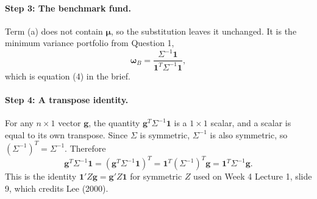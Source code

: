 \documentclass[11pt]{article}
\numberwithin{equation}{section}
\begin{document}
\paragraph{Step 3: The benchmark fund.}
Term (a) does not contain $\bm{\mu}$, so the substitution leaves it unchanged. It is the minimum variance portfolio from Question 1,
\begin{equation}
  \bm{\omega}_{B} = \frac{\Sigma^{-1}\mathbf{1}}{\mathbf{1}^{T}\Sigma^{-1}\mathbf{1}},
  \label{eq:q2-wB}
\end{equation}
which is equation (4) in the brief.

\paragraph{Step 4: A transpose identity.}
For any $n \times 1$ vector $\mathbf{g}$, the quantity $\mathbf{g}^{T}\Sigma^{-1}\mathbf{1}$ is a $1 \times 1$ scalar, and a scalar is equal to its own transpose. Since $\Sigma$ is symmetric, $\Sigma^{-1}$ is also symmetric, so $(\Sigma^{-1})^{T} = \Sigma^{-1}$. Therefore
\begin{equation}
  \mathbf{g}^{T}\Sigma^{-1}\mathbf{1} = \left(\mathbf{g}^{T}\Sigma^{-1}\mathbf{1}\right)^{T} = \mathbf{1}^{T}\left(\Sigma^{-1}\right)^{T}\mathbf{g} = \mathbf{1}^{T}\Sigma^{-1}\mathbf{g}.
  \label{eq:q2-transpose}
\end{equation}
This is the identity $\mathbf{1}'Z\mathbf{g} = \mathbf{g}'Z\mathbf{1}$ for symmetric $Z$ used on Week 4 Lecture 1, slide 9, which credits Lee (2000).
\end{document}
